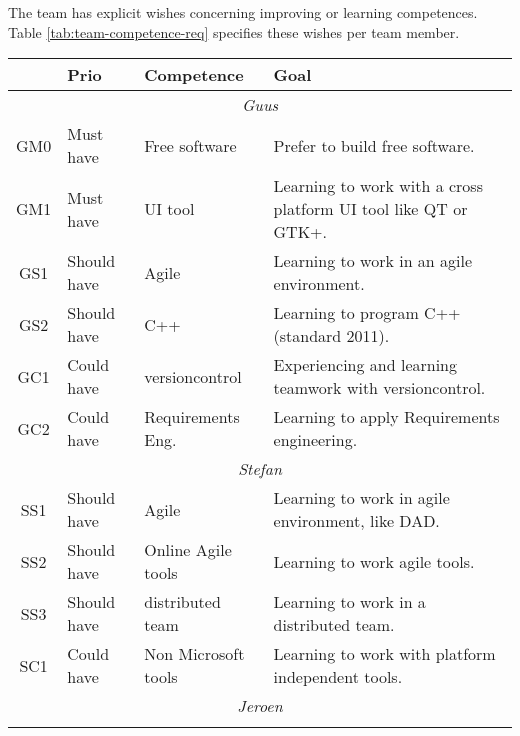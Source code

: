 
The team has explicit wishes concerning improving or learning competences. Table
\ref{tab:team-competence-req} specifies these wishes per team member.

\begin{center}
    \begin{tabular}{cllp{17em}}
        \hline
        & {\bf Prio} & {\bf Competence}    & {\bf Goal}\\
        \hline
        \multicolumn{4}{c}{\sf\emph{Guus}}\\
        \hline
		GM0 & Must have    & Free software & Prefer to build free software.\\
        GM1 & Must have    & UI tool       & Learning to work with a cross platform UI tool like QT or GTK+.\\
        GS1 & Should have  & Agile		   & Learning to work in an agile environment.\\
        GS2 & Should have  & C++		   & Learning to program C++ (standard 2011).\\
	GC1 & Could have   & versioncontrol	   & Experiencing and learning teamwork with versioncontrol.\\
        GC2 & Could have   & Requirements Eng.   & Learning to apply Requirements engineering.\\
        \hline
        \multicolumn{4}{c}{\sf\emph{Stefan}}\\
        \hline
        SS1 & Should have  & Agile		   & Learning to work in agile environment, like DAD.\\
        SS2 & Should have  & Online Agile tools  & Learning to work agile tools.\\
        SS3 & Should have  & distributed team    & Learning to work in a distributed team.\\
        SC1 & Could have   & Non Microsoft tools & Learning to work with platform independent tools.\\
        \hline
        \multicolumn{4}{c}{\sf\emph{Jeroen}}\\
        \hline
                     &                     & \\
        \hline
    \end{tabular}
    \label{tab:team-competence-req}
\end{center}
